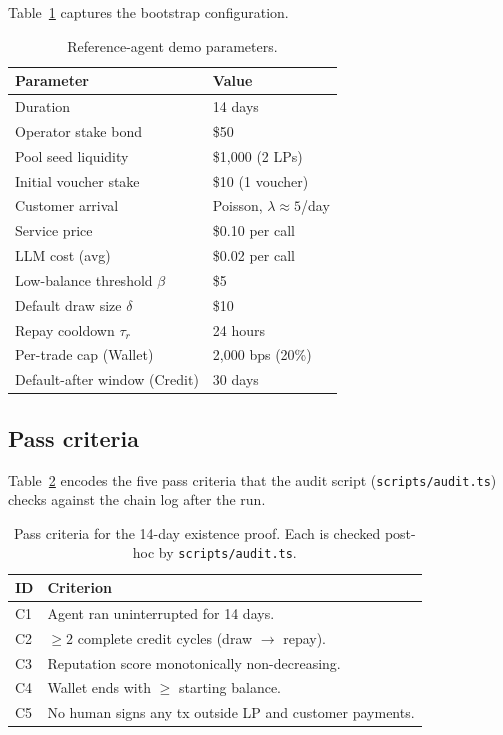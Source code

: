 \documentclass[10pt,conference,letterpaper]{IEEEtran}
\theoremstyle{definition}
\begin{document}
Table~\ref{tab:demo-params} captures the bootstrap configuration.

\begin{table}[t]
\caption{Reference-agent demo parameters.}
\label{tab:demo-params}
\centering
\small
\begin{tabularx}{\columnwidth}{lX}
\toprule
\textbf{Parameter} & \textbf{Value} \\
\midrule
Duration                                & 14 days \\
Operator stake bond                     & \$50 \\
Pool seed liquidity                     & \$1{,}000 (2 LPs) \\
Initial voucher stake                   & \$10 (1 voucher) \\
Customer arrival                        & Poisson, $\lambda \approx 5$/day \\
Service price                           & \$0.10 per call \\
LLM cost (avg)                          & \$0.02 per call \\
Low-balance threshold $\beta$           & \$5 \\
Default draw size $\delta$              & \$10 \\
Repay cooldown $\tau_r$                 & 24 hours \\
Per-trade cap (Wallet)                  & 2{,}000 bps (20\%) \\
Default-after window (Credit)           & 30 days \\
\bottomrule
\end{tabularx}
\end{table}

\subsection{Pass criteria}

Table~\ref{tab:pass} encodes the five pass criteria that the audit
script (\texttt{scripts/audit.ts}) checks against the chain log after
the run.

\begin{table}[t]
\caption{Pass criteria for the 14-day existence proof. Each is checked
post-hoc by \texttt{scripts/audit.ts}.}
\label{tab:pass}
\centering
\small
\begin{tabularx}{\columnwidth}{lX}
\toprule
\textbf{ID} & \textbf{Criterion} \\
\midrule
C1 & Agent ran uninterrupted for 14 days. \\
C2 & $\ge 2$ complete credit cycles (draw $\to$ repay). \\
C3 & Reputation score monotonically non-decreasing. \\
C4 & Wallet ends with $\ge$ starting balance. \\
C5 & No human signs any tx outside LP and customer payments. \\
\bottomrule
\end{tabularx}
\end{table}
\end{document}
